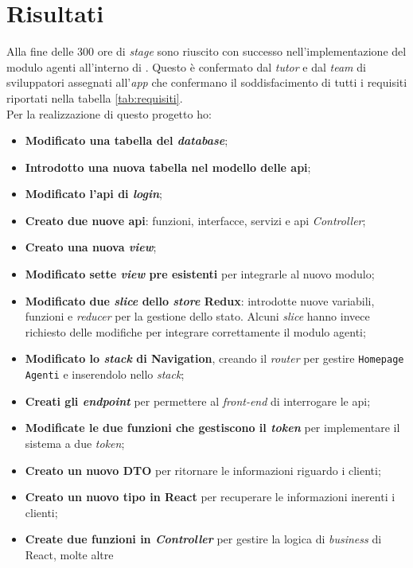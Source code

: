 \section{Risultati}
Alla fine delle 300 ore di \textit{stage} sono riuscito con successo nell'implementazione del modulo agenti all'interno di 
{\movi}. Questo è confermato dal \textit{tutor} e dal \textit{team} di sviluppatori assegnati all'\textit{app} che confermano 
il soddisfacimento di tutti i requisiti riportati nella tabella \ref{tab:requisiti}.\\
Per la realizzazione di questo progetto ho:
\begin{itemize}
    \item \textbf{Modificato una tabella del \textit{database}};
    \item \textbf{Introdotto una nuova tabella nel modello delle \gls{api}};
    \item \textbf{Modificato l'\gls{api} di \textit{login}};
    \item \textbf{Creato due nuove \gls{api}}: funzioni, interfacce, servizi e \gls{api} \textit{Controller};
    \item \textbf{Creato una nuova \textit{view}};
    \item \textbf{Modificato sette \textit{view} pre esistenti} per integrarle al nuovo modulo;
    \item \textbf{Modificato due \textit{slice} dello \textit{store} Redux}: introdotte nuove variabili, funzioni e \textit{reducer} 
          per la gestione dello stato. Alcuni \textit{slice} hanno invece richiesto delle modifiche per integrare correttamente il modulo agenti;
    \item \textbf{Modificato lo \textit{stack} di Navigation}, creando il \textit{router} per gestire \texttt{Homepage Agenti} e 
          inserendolo nello \textit{stack};
    \item \textbf{Creati gli \textit{endpoint}} per permettere al \textit{front-end} di interrogare le \gls{api};
    \item \textbf{Modificate le due funzioni che gestiscono il \textit{token}} per implementare il sistema a due \textit{token};
    \item \textbf{Creato un nuovo DTO} per ritornare le informazioni riguardo i clienti;
    \item \textbf{Creato un nuovo tipo in React} per recuperare le informazioni inerenti i clienti;
    \item \textbf{Create due funzioni in \textit{Controller}} per gestire la logica di \textit{business} di React, molte altre 

\end{itemize}
